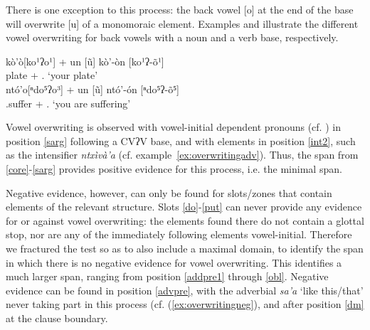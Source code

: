 \documentclass[output=paper]{langscibook}
\begin{document}
There is one exception to this process: the back vowel [o] at the end of the base will overwrite [u] of a monomoraic element.
Examples  and  illustrate the different vowel overwriting for back vowels with a noun and a verb base, respectively.

\ea \label{ex:overwritingo}
 \ea \label{ex:overwritingonoun}
    \gll kò'ò[ko¹ʔo¹] + un [ũ] \MVRightarrow{}kò'-òn [ko¹ʔ-õ¹] \\
        plate + \Ssg.\Nhon{} \MVRightarrow{} `your plate' \\
 \ex \label{ex:overwritingoverb}
    \gll ntó'o[ⁿdo⁵ʔo³] + un [ũ] \MVRightarrow{}ntó'-ón [ⁿdo⁵ʔ-õ⁵] \\
        \Incmpl.suffer  + \Ssg.\Nhon{} \MVRightarrow{} {`you are suffering'} \\
 \z 
\z


Vowel overwriting is observed with vowel-initial dependent pronouns (cf. ) in position \ref{sarg} following a CVʔV base, and with elements in position \ref{int2}, such as the intensifier \emph{ntxìvà'a} (cf. example~\ref{ex:overwritingadv}). Thus, the span from \ref{core}-\ref{sarg} provides positive evidence for this process, i.e. the minimal span.

Negative evidence, however, can only be found for slots/zones that contain elements of the relevant structure. Slots \ref{do}-\ref{put} can never provide any evidence for or against vowel overwriting: the elements found there do not contain a glottal stop, nor are any of the immediately following elements vowel-initial.
Therefore we fractured the test so as to also include a maximal domain, to identify the span in which there is no negative evidence for vowel overwriting.
This identifies a much larger span, ranging from position \ref{addpre1} through \ref{obl}. Negative evidence can be found in position \ref{advpre}, with the adverbial \emph{sa'a} `like this/that' never taking part in this process (cf. (\ref{ex:overwritingneg}), and after position \ref{dm} at the clause boundary.
\end{document}
